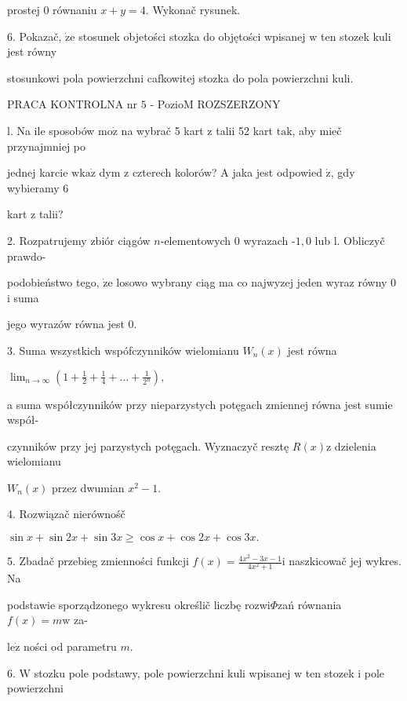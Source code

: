 \documentclass[a4paper,12pt]{article}
\begin{document}
prostej $0$ równaniu $x+y=4$. Wykonač rysunek.

6. Pokazač, $\dot{\mathrm{z}}\mathrm{e}$ stosunek objetości stozka do objętości wpisanej $\mathrm{w}$ ten stozek kuli jest równy

stosunkowi pola powierzchni cafkowitej stozka do pola powierzchni kuli.




PRACA KONTROLNA nr $5$ - PozioM ROZSZERZONY

l. Na ile sposobów $\mathrm{m}\mathrm{o}\dot{\mathrm{z}}$ na wybrač 5 kart $\mathrm{z}$ talii 52 kart $\mathrm{t}\mathrm{a}\mathrm{k}$, aby mieč przynajmniej po

jednej karcie $\mathrm{w}\mathrm{k}\mathrm{a}\dot{\mathrm{z}}$ dym $\mathrm{z}$ czterech kolorów? A jaka jest odpowied $\acute{\mathrm{z}}$, gdy wybieramy 6

kart $\mathrm{z}$ talii?

2. Rozpatrujemy zbiór ciągów $n$-elementowych $0$ wyrazach -$1, 0$ lub l. Obliczyč prawdo-

podobieństwo tego, $\dot{\mathrm{z}}\mathrm{e}$ losowo wybrany ciąg ma co najwyzej jeden wyraz równy 0 $\mathrm{i}$ suma

jego wyrazów równa jest 0.

3. Suma wszystkich wspófczynników wielomianu $W_{n}(x)$ jest równa

$\displaystyle \lim_{n\rightarrow\infty}(1+\frac{1}{2}+\frac{1}{4}+\ldots+\frac{1}{2^{n}}),$

a suma współczynników przy nieparzystych potęgach zmiennej równa jest sumie współ-

czynników przy jej parzystych potęgach. Wyznaczyč resztę $R(x)\mathrm{z}$ dzielenia wielomianu

$W_{n}(x)$ przez dwumian $x^{2}-1.$

4. Rozwiązač nierównośč

$\sin x+\sin 2x+\sin 3x\geq\cos x+\cos 2x+\cos 3x.$

5. Zbadač przebieg zmienności funkcji $f(x) = \displaystyle \frac{4x^{2}-3x-1}{4x^{2}+1} \mathrm{i}$ naszkicowač jej wykres. Na

podstawie sporządzonego wykresu określič liczbę rozwi$\Phi$zań równania $f(x) =m\mathrm{w}$ za-

$\mathrm{l}\mathrm{e}\dot{\mathrm{z}}$ ności od parametru $m.$

6. $\mathrm{W}$ stozku pole podstawy, pole powierzchni kuli wpisanej $\mathrm{w}$ ten stozek $\mathrm{i}$ pole powierzchni
\end{document}
